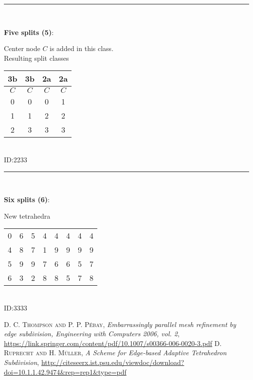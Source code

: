 \documentclass{article}
\begin{document}
	\rule{\textwidth}{0.5pt}
	\\

	\begin{minipage}{0.5\textwidth}
		\textbf{Five splits (5)}:

		\begin{center}
			
		\end{center}
	\end{minipage}
	\begin{minipage}{0.5\textwidth}
		Center node $C$ is added in this class.
		\\

		Resulting split classes

		\begin{tabular}{cccc}
			\hline
			3b & 3b & 2a & 2a \\
			\hline
			$C$ & $C$ & $C$ & $C$ \\
			0 & 0 & 0 & 1 \\
			1 & 1 & 2 & 2 \\
			2 & 3 & 3 & 3
		\end{tabular}
		\\

		ID:2233
	\end{minipage}

	\rule{\textwidth}{0.5pt}
	\\

	\begin{minipage}{0.5\textwidth}
		\textbf{Six splits (6)}:

		\begin{center}
			
		\end{center}
	\end{minipage}
	\begin{minipage}{0.5\textwidth}
		New tetrahedra

		\begin{tabular}{cccccccc}
			\hline
			0 & 6 & 5 & 4 & 4 & 4 & 4 & 4 \\
			4 & 8 & 7 & 1 & 9 & 9 & 9 & 9 \\
			5 & 9 & 9 & 7 & 6 & 6 & 5 & 7 \\
			6 & 3 & 2 & 8 & 8 & 5 & 7 & 8
		\end{tabular}
		\\

		ID:3333
	\end{minipage}

	\pagebreak
	\begin{thebibliography}{Bibliography}
		\textsc{D. C. Thompson and P. P. Pébay}, \textit{Embarrassingly parallel mesh refinement by edge subdivision, Engineering with Computers 2006, vol. 2}, \url{https://link.springer.com/content/pdf/10.1007/s00366-006-0020-3.pdf}
		\textsc{D. Ruprecht and H. Müller}, \textit{A Scheme for Edge-based Adaptive Tetrahedron Subdivision}, \url{http://citeseerx.ist.psu.edu/viewdoc/download?doi=10.1.1.42.9474&rep=rep1&type=pdf}
	\end{thebibliography}


	
\end{document}
